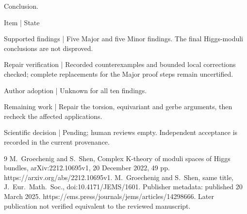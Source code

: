 \documentclass[10pt]{article}
\begin{document}
Conclusion.\par
Item | State\par
Supported findings | Five Major and five Minor findings. The final Higgs-moduli conclusions are not disproved.\par
Repair verification | Recorded counterexamples and bounded local corrections checked; complete replacements for the Major proof steps remain uncertified.\par
Author adoption | Unknown for all ten findings.\par
Remaining work | Repair the torsion, equivariant and gerbe arguments, then recheck the affected applications.\par
Scientific decision | Pending; human reviews empty. Independent acceptance is recorded in the current provenance.\par
9 M. Groechenig and S. Shen, Complex K-theory of moduli spaces of Higgs bundles, arXiv:2212.10695v1, 20 December 2022, 49 pp. https://arxiv.org/abs/2212.10695v1. M. Groechenig and S. Shen, same title, J. Eur. Math. Soc., doi:10.4171/JEMS/1601. Publisher metadata: published 20 March 2025. https://ems.press/journals/jems/articles/14298666. Later publication not verified equivalent to the reviewed manuscript.\par
\end{document}
